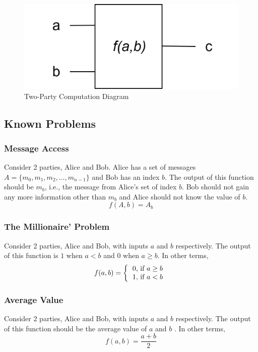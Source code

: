 \begin{refsection}
\renewcommand{\figurename}{Figure}
\begin{figure}[H]
\centering
\includegraphics[width=.4\linewidth]{./sdf/classical_mpc/figures/two_party_computation_scheme}
\caption{Two-Party Computation Diagram}
\label{fig:tpcscheme}
\end{figure}

\subsection{Known Problems}
\subsubsection{Message Access}
Consider 2 parties, Alice and Bob. Alice has a set of messages $A=\{m_0,m_1,m_2,\ldots,m_{n-1}\}$
and Bob has an index $b$. The output of this function should be $m_b$, i.e., the message from Alice's set of index $b$. Bob should not gain
any more information other than $m_b$ and Alice should not know the value of $b$.
\begin{equation}\label{eq:messageaccess}
f(A,b) = A_b
\end{equation}

\subsubsection{The Millionaire' Problem}
Consider 2 parties, Alice and Bob, with inputs $a$ and $b$ respectively. The output of this function is $1$ when $a < b$
and $0$ when $a \geq b$. In other terms,
\[
f(a,b) = \left \{
          \begin{tabular}{ccc}
          0, if $a \geq b$ \\
          1, if $a < b$
          \end{tabular}
        \right.
\]

\subsubsection{Average Value}
Consider 2 parties, Alice and Bob, with inputs $a$ and $b$ respectively. The output of this function should be the average value of $a$ and $b$
. In other terms,
\begin{equation}\label{eq:tpc}
f(a,b) = \frac{a+b}{2}
\end{equation}


\end{refsection}
